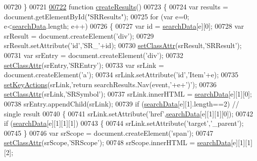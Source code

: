 \begin{DoxyCode}
00720 \}
00721 
\hypertarget{search_8js_source.tex_l00722}{}\hyperlink{search_8js_a6b2c651120de3ed1dcf0d85341d51895}{00722} \textcolor{keyword}{function} \hyperlink{search_8js_a6b2c651120de3ed1dcf0d85341d51895}{createResults}()
00723 \{
00724   var results = document.getElementById(\textcolor{stringliteral}{"SRResults"});
00725   \textcolor{keywordflow}{for} (var e=0; e<\hyperlink{all__0_8js_ad01a7523f103d6242ef9b0451861231e}{searchData}.length; e++)
00726   \{
00727     var \textcolor{keywordtype}{id} = \hyperlink{all__0_8js_ad01a7523f103d6242ef9b0451861231e}{searchData}[e][0];
00728     var srResult = document.createElement(\textcolor{stringliteral}{'div'});
00729     srResult.setAttribute(\textcolor{stringliteral}{'id'},\textcolor{stringliteral}{'SR\_'}+\textcolor{keywordtype}{id});
00730     \hyperlink{search_8js_a499422fc054a5278ae32801ec0082c56}{setClassAttr}(srResult,\textcolor{stringliteral}{'SRResult'});
00731     var srEntry = document.createElement(\textcolor{stringliteral}{'div'});
00732     \hyperlink{search_8js_a499422fc054a5278ae32801ec0082c56}{setClassAttr}(srEntry,\textcolor{stringliteral}{'SREntry'});
00733     var srLink = document.createElement(\textcolor{charliteral}{'a'});
00734     srLink.setAttribute(\textcolor{stringliteral}{'id'},\textcolor{stringliteral}{'Item'}+e);
00735     \hyperlink{search_8js_a98192fa2929bb8e4b0a890a4909ab9b2}{setKeyActions}(srLink,\textcolor{stringliteral}{'return searchResults.Nav(event,'}+e+\textcolor{charliteral}{')'});
00736     \hyperlink{search_8js_a499422fc054a5278ae32801ec0082c56}{setClassAttr}(srLink,\textcolor{stringliteral}{'SRSymbol'});
00737     srLink.innerHTML = \hyperlink{all__0_8js_ad01a7523f103d6242ef9b0451861231e}{searchData}[e][1][0];
00738     srEntry.appendChild(srLink);
00739     \textcolor{keywordflow}{if} (\hyperlink{all__0_8js_ad01a7523f103d6242ef9b0451861231e}{searchData}[e][1].length==2) \textcolor{comment}{// single result}
00740     \{
00741       srLink.setAttribute(\textcolor{stringliteral}{'href'},\hyperlink{all__0_8js_ad01a7523f103d6242ef9b0451861231e}{searchData}[e][1][1][0]);
00742       \textcolor{keywordflow}{if} (\hyperlink{all__0_8js_ad01a7523f103d6242ef9b0451861231e}{searchData}[e][1][1][1])
00743       \{
00744        srLink.setAttribute(\textcolor{stringliteral}{'target'},\textcolor{stringliteral}{'\_parent'});
00745       \}
00746       var srScope = document.createElement(\textcolor{stringliteral}{'span'});
00747       \hyperlink{search_8js_a499422fc054a5278ae32801ec0082c56}{setClassAttr}(srScope,\textcolor{stringliteral}{'SRScope'});
00748       srScope.innerHTML = \hyperlink{all__0_8js_ad01a7523f103d6242ef9b0451861231e}{searchData}[e][1][1][2];

\end{DoxyCode}
